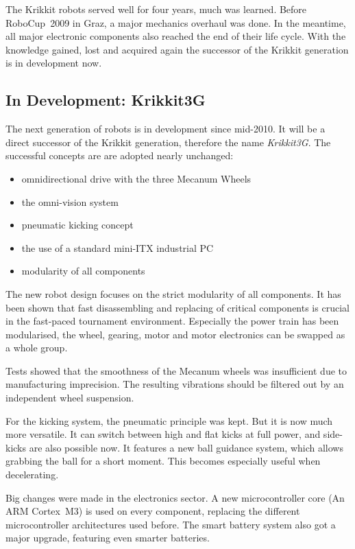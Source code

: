 \documentclass[12pt,a4paper]{article}
\begin{document}
The Krikkit robots served well for four years, much was learned.
Before RoboCup~2009 in Graz, a major mechanics overhaul was done.
In the meantime, all major electronic components also reached the end of their life cycle.
With the knowledge gained, lost and acquired again the successor of the Krikkit generation is in development now.
    

\subsection{In Development: Krikkit3G}

The next generation of robots is in development since mid-2010.
It will be a direct successor of the Krikkit generation, therefore the name \emph{Krikkit3G}.
The successful concepts are are adopted nearly unchanged:

\begin{itemize}
  \item omnidirectional drive with the three Mecanum Wheels
  \item the omni-vision system
  \item pneumatic kicking concept
  \item the use of a standard mini-ITX industrial PC
  \item modularity of all components
\end{itemize}

The new robot design focuses on the strict modularity of all components.
It has been shown that fast disassembling and replacing of critical components is crucial in the fast-paced tournament environment.
Especially the power train has been modularised, the wheel, gearing, motor and motor electronics can be swapped as a whole group.

Tests showed that the smoothness of the Mecanum wheels was insufficient due to manufacturing imprecision.
The resulting vibrations should be filtered out by an independent wheel suspension.


For the kicking system, the pneumatic principle was kept.
But it is now much more versatile. 
It can switch between high and flat kicks at full power, and side-kicks are also possible now.
It features a new ball guidance system, which allows grabbing the ball for a short moment.
This becomes especially useful when decelerating.

Big changes were made in the electronics sector.
A new microcontroller core (An ARM Cortex~M3) is used on every component, replacing the different microcontroller architectures used before.
The smart battery system also got a major upgrade, featuring even smarter batteries.
\end{document}
